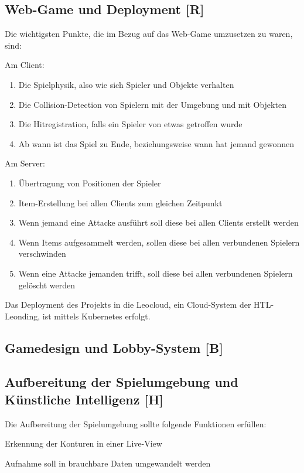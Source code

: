 \subsection{Web-Game und Deployment [R]}
Die wichtigsten Punkte, die im Bezug auf das Web-Game umzusetzen zu waren, sind:
\begin{compactitem}
    \item Am Client:
        \begin{enumerate}
            \item Die Spielphysik, also wie sich Spieler und Objekte verhalten
            \item Die Collision-Detection von Spielern mit der Umgebung und mit Objekten
            \item Die Hitregistration, falls ein Spieler von etwas getroffen wurde
            \item Ab wann ist das Spiel zu Ende, beziehungsweise wann hat jemand gewonnen 
        \end{enumerate}
    \item Am Server:
        \begin{enumerate}
            \item Übertragung von Positionen der Spieler
            \item Item-Erstellung bei allen Clients zum gleichen Zeitpunkt
            \item Wenn jemand eine Attacke ausführt soll diese bei allen Clients erstellt werden
            \item Wenn Items aufgesammelt werden, sollen diese bei allen verbundenen Spielern verschwinden
            \item Wenn eine Attacke jemanden trifft, soll diese bei allen verbundenen Spielern gelöscht werden
        \end{enumerate}

\end{compactitem} 
Das Deployment des Projekts in die Leocloud, ein Cloud-System der HTL-Leonding, ist mittels Kubernetes erfolgt.


\subsection{Gamedesign und Lobby-System [B]}

\subsection{Aufbereitung der Spielumgebung und Künstliche Intelligenz [H]}
Die Aufbereitung der Spielumgebung sollte folgende Funktionen erfüllen:
\begin{compactitem}
    \item Erkennung der Konturen in einer Live-View
    \item Aufnahme soll in brauchbare Daten umgewandelt werden
\end{compactitem}

